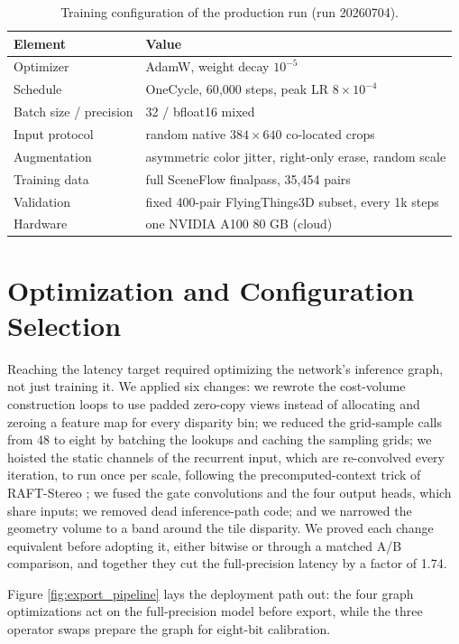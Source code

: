 \begin{table}[H]
\centering
\caption{Training configuration of the production run (run 20260704).}
\label{tab:train_config}
\small
\begin{tabular}{ll}
\toprule
Element & Value\\
\midrule
Optimizer & AdamW, weight decay $10^{-5}$\\
Schedule & OneCycle, 60{,}000 steps, peak LR $8\times 10^{-4}$\\
Batch size / precision & 32 / bfloat16 mixed\\
Input protocol & random native $384\times 640$ co-located crops\\
Augmentation & asymmetric color jitter, right-only erase, random scale\\
Training data & full SceneFlow finalpass, 35{,}454 pairs\\
Validation & fixed 400-pair FlyingThings3D subset, every 1k steps\\
Hardware & one NVIDIA A100 80 GB (cloud)\\
\bottomrule
\end{tabular}
\end{table}

\FloatBarrier
\section{Optimization and Configuration Selection}
\label{sec:optimization}
Reaching the latency target required optimizing the network's
inference graph, not just training it. We applied six changes: we
rewrote the cost-volume construction loops to use padded zero-copy
views instead of allocating and zeroing a feature map for every
disparity bin; we reduced the grid-sample calls from 48 to eight by
batching the lookups and caching the sampling grids; we hoisted the
static channels of the recurrent input, which are re-convolved every
iteration, to run once per scale, following the precomputed-context
trick of RAFT-Stereo \cite{lipson2021raftstereo}; we fused the gate
convolutions and the four output heads, which share inputs; we removed
dead inference-path code; and we narrowed the geometry volume to a band
around the tile disparity. We proved each change equivalent before
adopting it, either bitwise or through a matched A/B comparison, and
together they cut the full-precision latency by a factor of 1.74.

Figure \ref{fig:export_pipeline} lays the deployment path out: the four
graph optimizations act on the full-precision model before export,
while the three operator swaps prepare the graph for eight-bit
calibration.

